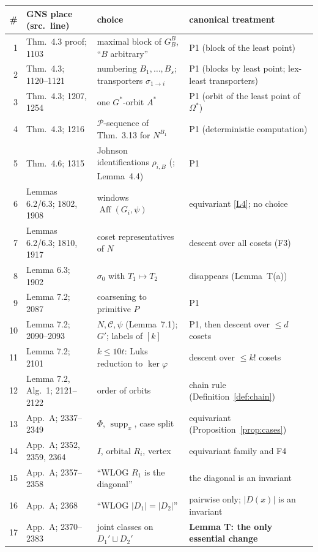\documentclass[11pt]{article}
\theoremstyle{plain}
\theoremstyle{definition}
\theoremstyle{remark}
\theoremstyle{named}
\theoremstyle{namedrm}
\newcommand{\Aff}{\operatorname{Aff}}
\newcommand{\supp}{\operatorname{supp}}
\newcommand{\cC}{\mathcal{C}}
\begin{document}
\begin{table}[!htbp]
\centering\small
\begin{tabularx}{\linewidth}{@{}rL{3.1cm}L{4.1cm}Y@{}}
\toprule
\# & GNS place (src.\ line) & choice & canonical treatment\\
 & Thm.~4.3 proof; 1103 & maximal block of $G_B^B$, ``$B$ arbitrary'' & P1 (block of the least point)\\
2 & Thm.~4.3; 1120--1121 & numbering $B_1,\dots,B_s$; transporters $\sigma_{1\to i}$ & P1 (blocks by least point; lex-least transporters)\\
3 & Thm.~4.3; 1207, 1254 & one $G^*$-orbit $A^*$ & P1 (orbit of the least point of $\Omega^*$)\\
4 & Thm.~4.3; 1216 & $\mathcal P$-sequence of Thm.~3.13 for $N^{B_1}$ & P1 (deterministic computation)\\
5 & Thm.~4.6; 1315 & Johnson identifications $\rho_{i,B}$ (\cite{BLS87}; Lemma~4.4) & P1\\
6 & Lemmas 6.2/6.3; 1802, 1908 & windows $\Aff(G_i,\psi)$ & equivariant \ref{L4}; no choice\\
7 & Lemmas 6.2/6.3; 1810, 1917 & coset representatives of $N$ & descent over all cosets (F3)\\
8 & Lemma 6.3; 1902 & $\sigma_0$ with $T_1\mapsto T_2$ & disappears (Lemma~T(a))\\
9 & Lemma 7.2; 2087 & coarsening to primitive $P$ & P1\\
10 & Lemma 7.2; 2090--2093 & $N,\cC,\psi$ (Lemma~7.1); $G'$; labels of $[k]$ & P1, then descent over $\le d$ cosets\\
11 & Lemma 7.2; 2101 & $k\le10t$: Luks reduction to $\ker\varphi$ & descent over $\le k!$ cosets\\
12 & Lemma 7.2, Alg.~1; 2121--2122 & order of orbits & chain rule (Definition~\ref{def:chain})\\
13 & App.~A; 2337--2349 & $\Phi$, $\supp_x$, case split & equivariant (Proposition~\ref{prop:cases})\\
14 & App.~A; 2352, 2359, 2364 & $I$, orbital $R_i$, vertex & equivariant family and F4\\
15 & App.~A; 2357--2358 & ``WLOG $R_1$ is the diagonal'' & the diagonal is an invariant\\
16 & App.~A; 2368 & ``WLOG $|D_1|=|D_2|$'' & pairwise only; $|D(x)|$ is an invariant\\
17 & App.~A; 2370--2383 & joint classes on $D_1'\sqcup D_2'$ & \textbf{Lemma T: the only essential change}\\

\end{tabularx}
\end{table}
\end{document}
